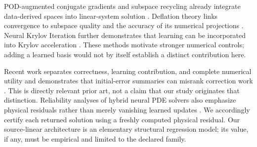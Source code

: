 POD-augmented conjugate gradients and subspace recycling already integrate data-derived spaces into linear-system solution \cite{pod}. Deflation theory links convergence to subspace quality and the accuracy of its numerical projections \cite{deflation}. Neural Krylov Iteration further demonstrates that learning can be incorporated into Krylov acceleration \cite{nki}. These methods motivate stronger numerical controls; adding a learned basis would not by itself establish a distinct contribution here.

Recent work separates correctness, learning contribution, and complete numerical utility and demonstrates that initial-error summaries can misrank correction work \cite{transfer}. This is directly relevant prior art, not a claim that our study originates that distinction. Reliability analyses of hybrid neural PDE solvers also emphasize physical residuals rather than merely vanishing learned updates \cite{reliable}. We accordingly certify each returned solution using a freshly computed physical residual. Our source-linear architecture is an elementary structural regression model; its value, if any, must be empirical and limited to the declared family.
